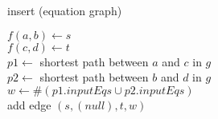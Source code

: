 \begin{algorithm}[h]
\caption[.]{insert (equation graph)}
	
	{
		$f(a,b) \leftarrow s$ \\
		$f(c,d) \leftarrow t$ \\
		$p1 \leftarrow $ shortest path between $a$ and $c$ in $g$ \\
		$p2 \leftarrow $ shortest path between $b$ and $d$ in $g$ \\
		$w \leftarrow \#(p1.inputEqs \cup p2.inputEqs) $ \\
		add edge $(s,(null),t,w)$ %
	}
  
  \label{algo:insert_dij}
\end{algorithm}
